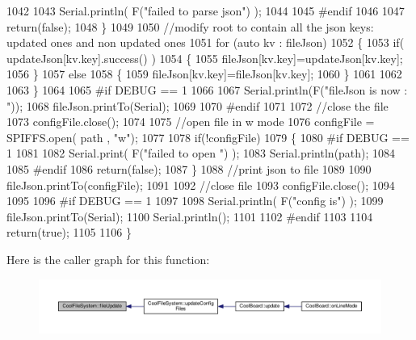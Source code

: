 \begin{DoxyCode}
1042 
1043         Serial.println( F(\textcolor{stringliteral}{"failed to parse json"}) );
1044 
1045 \textcolor{preprocessor}{    #endif}
1046 
1047         \textcolor{keywordflow}{return}(\textcolor{keyword}{false});
1048     \}
1049     
1050     \textcolor{comment}{//modify root to contain all the json keys: updated ones and non updated ones}
1051     \textcolor{keywordflow}{for} (\textcolor{keyword}{auto} kv : fileJson) 
1052     \{
1053         \textcolor{keywordflow}{if}( updateJson[kv.key].success() )
1054         \{
1055             fileJson[kv.key]=updateJson[kv.key];            
1056         \}
1057         \textcolor{keywordflow}{else}
1058         \{
1059             fileJson[kv.key]=fileJson[kv.key];
1060         \}
1061 
1062                 
1063     \}
1064 
1065 \textcolor{preprocessor}{#if DEBUG == 1}
1066 
1067     Serial.println(F(\textcolor{stringliteral}{"fileJson is now : "}));
1068     fileJson.printTo(Serial);
1069 
1070 \textcolor{preprocessor}{#endif}
1071 
1072     \textcolor{comment}{//close the file}
1073     configFile.close();
1074 
1075     \textcolor{comment}{//open file in w mode}
1076     configFile = SPIFFS.open( path , \textcolor{stringliteral}{"w"});
1077     
1078     \textcolor{keywordflow}{if}(!configFile)
1079     \{   
1080 \textcolor{preprocessor}{    #if DEBUG == 1}
1081         
1082         Serial.print( F(\textcolor{stringliteral}{"failed to open "}) );
1083         Serial.println(path);
1084 
1085 \textcolor{preprocessor}{    #endif}
1086         \textcolor{keywordflow}{return}(\textcolor{keyword}{false});
1087     \}
1088     \textcolor{comment}{//print json to file    }
1089     
1090     fileJson.printTo(configFile);
1091     
1092     \textcolor{comment}{//close file}
1093     configFile.close();
1094 
1095 
1096 \textcolor{preprocessor}{#if DEBUG == 1}
1097 
1098     Serial.println( F(\textcolor{stringliteral}{"config is"}) );
1099     fileJson.printTo(Serial);
1100     Serial.println();
1101 
1102 \textcolor{preprocessor}{#endif}
1103     
1104     \textcolor{keywordflow}{return}(\textcolor{keyword}{true});
1105     
1106 \}
\end{DoxyCode}
Here is the caller graph for this function\+:\nopagebreak
\begin{figure}[H]
\begin{center}
\leavevmode
\includegraphics[width=350pt]{db/d0c/class_cool_file_system_a13f2958f5b87757c31fc53797a30d23a_icgraph}
\end{center}
\end{figure}
\mbox{\label{class_cool_file_system_a3223ffff4266a6300988fab956d6b4b2}} 
